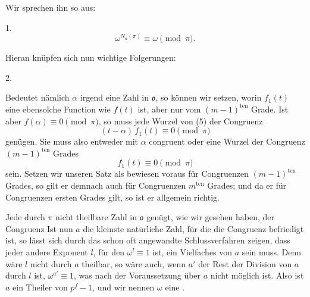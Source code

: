Wir sprechen ihn so aus:

1. 
\[ \omega^{N_a(\pi)} \equiv \omega \pmod{\pi}. \]

Hieran knüpfen sich nun wichtige Folgerungen:

2. 

Bedeutet nämlich $\alpha$ irgend eine Zahl in $\mathfrak{o}$, so können wir
setzen, worin $f_1(t)$ eine ebensolche Function wie $f(t)$ ist, aber nur vom $(m-1)^{\text{ten}}$ Grade. Ist aber $f(\alpha) \equiv 0 \pmod{\pi}$, so muss jede Wurzel von (5) der Congruenz
\[ (t-\alpha)\,f_1(t) \equiv 0 \pmod{\pi} \]
genügen. Sie muss also entweder mit $\alpha$ congruent oder eine Wurzel der Congruenz $(m-1)^{\text{ten}}$ Grades
\[ f_1(t) \equiv 0 \pmod{\pi} \]
sein. Setzen wir unseren Satz als bewiesen voraus für Congruenzen $(m-1)^{\text{ten}}$ Grades, so gilt er demnach auch für Congruenzen $m^{\text{ten}}$ Grades; und da er für Congruenzen ersten Grades gilt, so ist er allgemein richtig.

Jede durch $\pi$ nicht theilbare Zahl in $\mathfrak{o}$ genügt, wie wir gesehen haben, der Congruenz
Ist nun $a$ die kleinste natürliche Zahl, für die die Congruenz
befriedigt ist, so lässt sich durch das schon oft angewandte Schlussverfahren zeigen, dass jeder andere Exponent $l$, für den $\omega^l \equiv 1$ ist, ein Vielfaches von $a$ sein muss. Denn wäre $l$ nicht durch $a$ theilbar, so wäre auch, wenn $a'$ der Rest der Division von $a$ durch $l$ ist, $\omega^{a'} \equiv 1$, was nach der Voraussetzung über $a$ nicht möglich ist. %
Also ist $a$ ein Theiler von $p^f-1$, und wir nennen $\omega$ eine .
